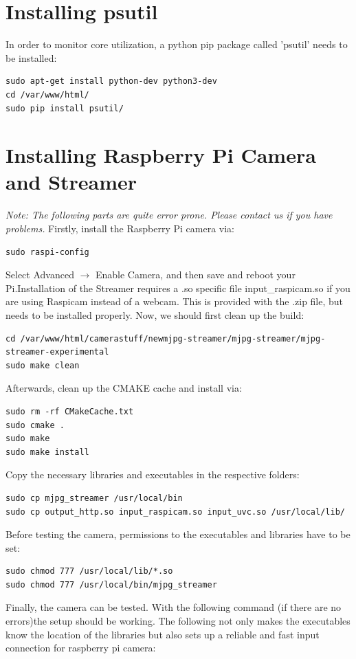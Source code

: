 \section{Installing psutil}
In order to monitor core utilization, a python pip package called 'psutil' needs to be installed:
\begin{lstlisting}
sudo apt-get install python-dev python3-dev
cd /var/www/html/
sudo pip install psutil/
\end{lstlisting}
\section{Installing Raspberry Pi Camera and Streamer}
\textit{Note: The following parts are quite error prone. Please contact us if you have problems.}
Firstly, install the Raspberry Pi camera via:
\begin{lstlisting}
sudo raspi-config
\end{lstlisting}
Select Advanced $\rightarrow$ Enable Camera, and then save and reboot your Pi.Installation of the Streamer requires a .so specific file input\_raspicam.so if you are using Raspicam instead of a webcam. This is provided with the .zip file, but needs to be installed properly. Now, we should first clean up the build:
\begin{lstlisting}
cd /var/www/html/camerastuff/newmjpg-streamer/mjpg-streamer/mjpg-streamer-experimental
sudo make clean
\end{lstlisting}
Afterwards, clean up the CMAKE cache and install via:
\begin{lstlisting}
sudo rm -rf CMakeCache.txt
sudo cmake .
sudo make
sudo make install
\end{lstlisting}
Copy the necessary libraries and executables in the respective folders:
\begin{lstlisting}
sudo cp mjpg_streamer /usr/local/bin
sudo cp output_http.so input_raspicam.so input_uvc.so /usr/local/lib/
\end{lstlisting}
Before testing the camera,  permissions to the executables and libraries have to be set:
\begin{lstlisting}
sudo chmod 777 /usr/local/lib/*.so
sudo chmod 777 /usr/local/bin/mjpg_streamer
\end{lstlisting}
Finally, the camera can be tested. With the following command (if there are no errors)the setup should be working. The following not only makes the executables know the location of the libraries but also sets up a reliable and fast input connection for raspberry pi camera:
